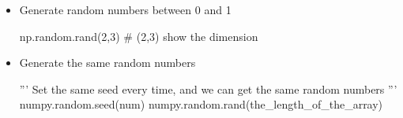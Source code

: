 \documentclass{article}
\begin{document}
\begin{enumerate}
\begin{itemize}
\item Generate random numbers between 0 and 1
\begin{python}
np.random.rand(2,3) # (2,3) show the dimension
\end{python}

\item Generate the same random numbers
\begin{python}
'''
Set the same seed every time,
and we can get the same random numbers
'''
numpy.random.seed(num)
numpy.random.rand(the_length_of_the_array)
\end{python}

\end{itemize}


\end{enumerate} 
\end{document}
